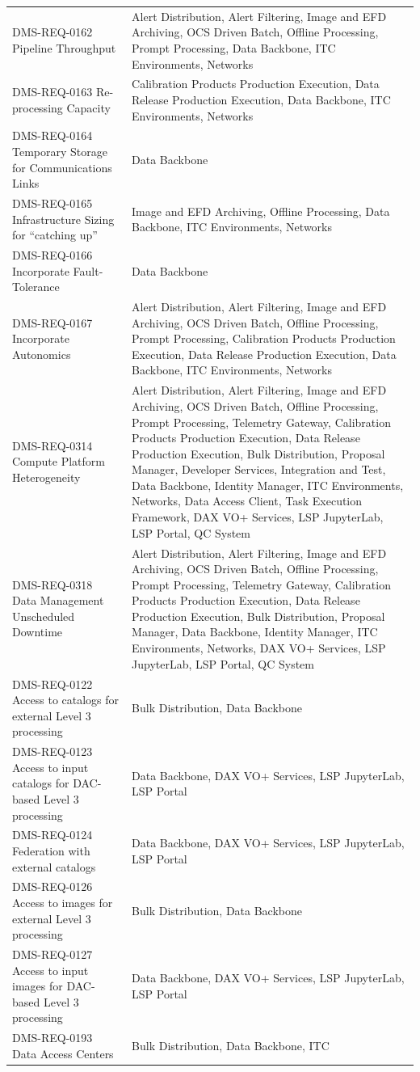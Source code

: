 \documentclass[]{article}
\begin{document}
\begin{longtable}[]{@{}ll@{}}
DMS-REQ-0162 Pipeline Throughput & Alert Distribution, Alert Filtering,
Image and EFD Archiving, OCS Driven Batch, Offline Processing, Prompt
Processing, Data Backbone, ITC Environments, Networks\tabularnewline
DMS-REQ-0163 Re-processing Capacity & Calibration Products Production
Execution, Data Release Production Execution, Data Backbone, ITC
Environments, Networks\tabularnewline
DMS-REQ-0164 Temporary Storage for Communications Links & Data
Backbone\tabularnewline
DMS-REQ-0165 Infrastructure Sizing for ``catching up'' & Image and EFD
Archiving, Offline Processing, Data Backbone, ITC Environments,
Networks\tabularnewline
DMS-REQ-0166 Incorporate Fault-Tolerance & Data Backbone\tabularnewline
DMS-REQ-0167 Incorporate Autonomics & Alert Distribution, Alert
Filtering, Image and EFD Archiving, OCS Driven Batch, Offline
Processing, Prompt Processing, Calibration Products Production
Execution, Data Release Production Execution, Data Backbone, ITC
Environments, Networks\tabularnewline
DMS-REQ-0314 Compute Platform Heterogeneity & Alert Distribution, Alert
Filtering, Image and EFD Archiving, OCS Driven Batch, Offline
Processing, Prompt Processing, Telemetry Gateway, Calibration Products
Production Execution, Data Release Production Execution, Bulk
Distribution, Proposal Manager, Developer Services, Integration and
Test, Data Backbone, Identity Manager, ITC Environments, Networks, Data
Access Client, Task Execution Framework, DAX VO+ Services, LSP
JupyterLab, LSP Portal, QC System\tabularnewline
DMS-REQ-0318 Data Management Unscheduled Downtime & Alert Distribution,
Alert Filtering, Image and EFD Archiving, OCS Driven Batch, Offline
Processing, Prompt Processing, Telemetry Gateway, Calibration Products
Production Execution, Data Release Production Execution, Bulk
Distribution, Proposal Manager, Data Backbone, Identity Manager, ITC
Environments, Networks, DAX VO+ Services, LSP JupyterLab, LSP Portal, QC
System\tabularnewline
DMS-REQ-0122 Access to catalogs for external Level 3 processing & Bulk
Distribution, Data Backbone\tabularnewline
DMS-REQ-0123 Access to input catalogs for DAC-based Level 3 processing &
Data Backbone, DAX VO+ Services, LSP JupyterLab, LSP
Portal\tabularnewline
DMS-REQ-0124 Federation with external catalogs & Data Backbone, DAX VO+
Services, LSP JupyterLab, LSP Portal\tabularnewline
DMS-REQ-0126 Access to images for external Level 3 processing & Bulk
Distribution, Data Backbone\tabularnewline
DMS-REQ-0127 Access to input images for DAC-based Level 3 processing &
Data Backbone, DAX VO+ Services, LSP JupyterLab, LSP
Portal\tabularnewline
DMS-REQ-0193 Data Access Centers & Bulk Distribution, Data Backbone, ITC

\end{longtable}
\end{document}
